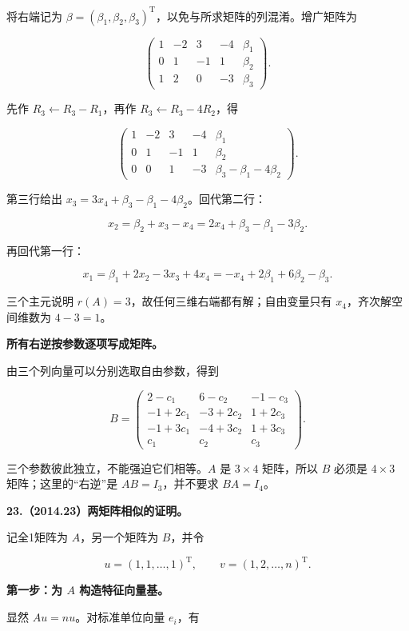 \documentclass[UTF8,11pt,fontset=windows]{ctexart}
\begin{document}
将右端记为 $\beta=(\beta_1,\beta_2,\beta_3)^{\mathrm T}$，以免与所求矩阵的列混淆。增广矩阵为

$$
\left(\begin{array}{rrrr|r}
1&-2&3&-4&\beta_1\\
0&1&-1&1&\beta_2\\
1&2&0&-3&\beta_3
\end{array}\right).
$$

先作 $R_3\leftarrow R_3-R_1$，再作 $R_3\leftarrow R_3-4R_2$，得

$$
\left(\begin{array}{rrrr|r}
1&-2&3&-4&\beta_1\\
0&1&-1&1&\beta_2\\
0&0&1&-3&\beta_3-\beta_1-4\beta_2
\end{array}\right).
$$

第三行给出 $x_3=3x_4+\beta_3-\beta_1-4\beta_2$。回代第二行：

$$
x_2=\beta_2+x_3-x_4
=2x_4+\beta_3-\beta_1-3\beta_2.
$$

再回代第一行：

$$
x_1=\beta_1+2x_2-3x_3+4x_4
=-x_4+2\beta_1+6\beta_2-\beta_3.
$$

三个主元说明 $r(A)=3$，故任何三维右端都有解；自由变量只有 $x_4$，齐次解空间维数为 $4-3=1$。

\textbf{所有右逆按参数逐项写成矩阵。}

由三个列向量可以分别选取自由参数，得到

$$
B=\begin{pmatrix}
2-c_1&6-c_2&-1-c_3\\
-1+2c_1&-3+2c_2&1+2c_3\\
-1+3c_1&-4+3c_2&1+3c_3\\
c_1&c_2&c_3
\end{pmatrix}.
$$

三个参数彼此独立，不能强迫它们相等。$A$ 是 $3\times4$ 矩阵，所以 $B$ 必须是 $4\times3$ 矩阵；这里的“右逆”是 $AB=I_3$，并不要求 $BA=I_4$。

\clearpage

\textbf{23.（2014.23）两矩阵相似的证明。}

记全1矩阵为 $A$，另一个矩阵为 $B$，并令

$$
u=(1,1,\ldots,1)^{\mathrm T},\qquad
v=(1,2,\ldots,n)^{\mathrm T}.
$$

\textbf{第一步：为 $A$ 构造特征向量基。}

显然 $Au=nu$。对标准单位向量 $e_i$，有
\end{document}
